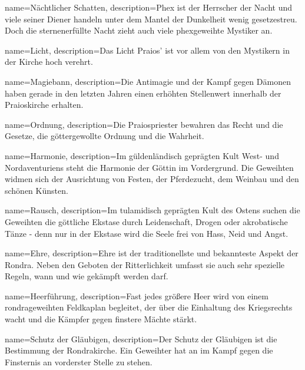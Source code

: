 {
    name={Nächtlicher Schatten},
    description={Phex ist der Herrscher der Nacht und viele seiner Diener handeln unter dem Mantel der Dunkelheit wenig gesetzestreu. Doch die sternenerfüllte Nacht zieht auch viele phexgeweihte Mystiker an. }
}


{
    name={Licht},
    description={Das Licht Praios' ist vor allem von den Mystikern in der Kirche hoch verehrt. }
}


{
    name={Magiebann},
    description={Die Antimagie und der Kampf gegen Dämonen haben gerade in den letzten Jahren einen erhöhten Stellenwert innerhalb der Praioskirche erhalten.}
}


{
    name={Ordnung},
    description={Die Praiospriester bewahren das Recht und die Gesetze, die göttergewollte Ordnung und die Wahrheit. }
}


{
    name={Harmonie},
    description={Im güldenländisch geprägten Kult West- und Nordaventuriens steht die Harmonie der Göttin im Vordergrund. Die Geweihten widmen sich der Ausrichtung von Festen, der Pferdezucht, dem Weinbau und den schönen Künsten. }
}


{
    name={Rausch},
    description={Im tulamidisch geprägten Kult des Ostens suchen die Geweihten die göttliche Ekstase durch Leidenschaft, Drogen oder akrobatische Tänze - denn nur in der Ekstase wird die Seele frei von Hass, Neid und Angst.}
}


{
    name={Ehre},
    description={Ehre ist der traditionellste und bekannteste Aspekt der Rondra. Neben den Geboten der Ritterlichkeit umfasst sie auch sehr spezielle Regeln, wann und wie gekämpft werden darf.}
}


{
    name={Heerführung},
    description={Fast jedes größere Heer wird von einem rondrageweihten Feldkaplan begleitet, der über die Einhaltung des Kriegsrechts wacht und die Kämpfer gegen finstere Mächte stärkt. }
}


{
    name={Schutz der Gläubigen},
    description={Der Schutz der Gläubigen ist die Bestimmung der Rondrakirche. Ein Geweihter hat an im Kampf gegen die Finsternis an vorderster Stelle zu stehen.}
}


